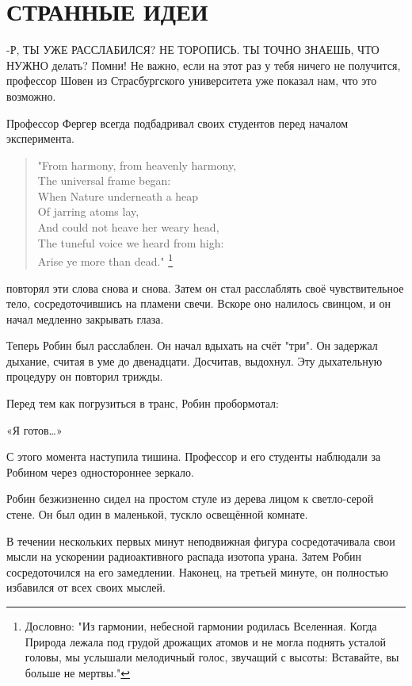 \documentclass[a4paper,12pt]{book}
\begin{document}
\chapter{СТРАННЫЕ ИДЕИ}
\noindent\par-Р{, ТЫ УЖЕ РАССЛАБИЛСЯ? НЕ ТОРОПИСЬ. ТЫ ТОЧНО ЗНАЕШЬ, ЧТО НУЖНО} делать? Помни! Не важно, если на этот раз у тебя ничего не получится, профессор Шовен из Страсбургского университета уже показал нам, что это возможно.
\par
Профессор Фергер всегда подбадривал своих студентов перед началом эксперимента.
\begin{quote}
"From harmony, from heavenly harmony,\\
The universal frame began:\\
When Nature underneath a heap\\
Of jarring atoms lay,\\
And could not heave her weary head,\\
The tuneful voice we heard from high:\\
Arise ye more than dead." \footnote{Дословно: "Из гармонии, небесной гармонии родилась Вселенная. Когда Природа лежала под грудой дрожащих атомов и не могла поднять усталой головы, мы услышали мелодичный голос, звучащий с высоты: Вставайте, вы больше не мертвы."}
\end{quote}
 повторял эти слова снова и снова. Затем он стал расслаблять своё чувствительное тело, сосредоточившись на пламени свечи. Вскоре оно налилось свинцом, и он начал медленно закрывать глаза.
\par
Теперь Робин был расслаблен.  Он начал вдыхать на счёт "три". Он задержал дыхание, считая в уме до двенадцати. Досчитав, выдохнул. Эту дыхательную процедуру он повторил трижды.
\par
Перед тем как погрузиться в транс, Робин пробормотал:
\par
«Я готов…»\\
\par
С этого момента наступила тишина. Профессор и его студенты наблюдали за Робином через одностороннее зеркало.\\
\par
Робин безжизненно сидел на простом стуле из дерева лицом к светло-серой стене. Он был один в маленькой, тускло освещённой комнате.
\par
В течении нескольких первых минут неподвижная фигура сосредотачивала свои мысли на ускорении радиоактивного распада изотопа урана. Затем Робин сосредоточился на его замедлении. Наконец, на третьей минуте, он полностью избавился от всех своих мыслей.
\end{document}
